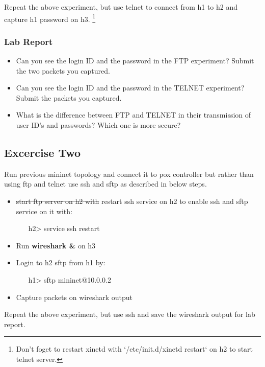 \documentclass[10pt,a4paper]{article}
\numberwithin{equation}{section}
\numberwithin{figure}{section}
\numberwithin{table}{section}
\begin{document}
Repeat the above experiment, but use telnet to connect from h1 to h2 and capture h1 password on h3. \footnote{Don't foget to restart xinetd with `/etc/init.d/xinetd restart` on h2 to start telnet server. }

\subsubsection*{ Lab Report}
\begin{itemize}
	\setlength{\itemindent}{0pt}
	\item Can you see the login ID and the password in the FTP experiment? Submit the two packets you captured.
	\item Can you see the login ID and the password in the TELNET experiment? Submit the packets you captured.
	\item What is the difference between FTP and TELNET in their transmission of user ID’s and passwords? Which one is more secure?
\end{itemize}

\subsection{Excercise Two}
Run previous mininet topology and connect it to pox controller but rather than using ftp and telnet use ssh and sftp as described in below steps.

\begin{itemize}
	\setlength{\itemindent}{10pt}
	\item \sout{start ftp server on h2 with}  restart ssh service on h2 to enable ssh and sftp service on it with:
	\begin{enumerate}
		\setlength{\itemindent}{10pt}
		\item [h2>] service ssh restart
	\end{enumerate}
	\item Run \textbf{wireshark \&} on h3
	\item Login to h2 sftp from h1 by:
	\begin{enumerate}
		\setlength{\itemindent}{10pt}
		\item [h1>] sftp mininet@10.0.0.2
	\end{enumerate}
	\item Capture packets on wireshark output
	
\end{itemize}

Repeat the above experiment, but use ssh and save the wireshark output for lab report.
\end{document}
